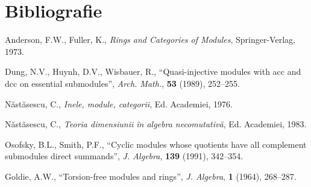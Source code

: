 \documentclass[12pt,a4paper]{book}
\theoremstyle{plain}
\theoremstyle{definition}
\theoremstyle{remark}
\begin{document}
\chapter*{Bibliografie}

\noindent Anderson, F.W., Fuller, K., \emph{Rings and Categories of Modules}, Springer\mbox{-}Verlag, 1973.

\medskip

\noindent Dung, N.V., Huynh, D.V., Wisbauer, R., ``Quasi-injective modules with acc and dcc on essential submodules'', \emph{Arch. Math.}, \textbf{53} (1989), 252--255.

\medskip

\noindent Năstăsescu, C., \emph{Inele, module, categorii}, Ed. Academiei, 1976.

\medskip

\noindent Năstăsescu, C., \emph{Teoria dimensiunii în algebra necomutativă}, Ed. Academiei, 1983.

\medskip

\noindent Osofsky, B.L., Smith, P.F., ``Cyclic modules whose quotients have all complement submodules direct summands'', \emph{J. Algebra}, \textbf{139} (1991), 342--354.

\medskip

\noindent Goldie, A.W., ``Torsion-free modules and rings'', \emph{J. Algebra}, \textbf{1} (1964), 268--287.


\backmatter

% 
% 
\end{document}
